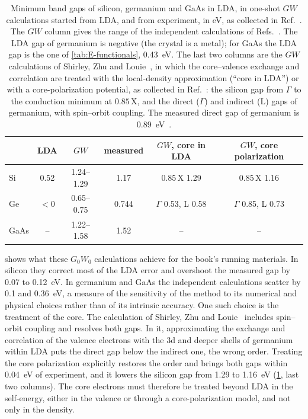 \begin{table}[t]
  \centering
  \caption{Minimum band gaps of silicon, germanium and GaAs in LDA, in one-shot $GW$ calculations started from LDA, and from experiment, in eV, as collected in Ref.~\cite[Table~I]{aryasetiawan1998gw}. The $GW$ column gives the range of the independent calculations of Refs.~\cite{hybertsen1986electron,godby1988self,rohlfing1993quasiparticle,zhu1991quasiparticle}. The LDA gap of germanium is negative (the crystal is a metal); for GaAs the LDA gap is the one of \cref{tab:E-functionals}, \SI{0.43}{eV}. The last two columns are the $GW$ calculations of Shirley, Zhu and Louie~\cite{shirley1992core}, in which the core--valence exchange and correlation are treated with the local-density approximation (``core in LDA'') or with a core-polarization potential, as collected in Ref.~\cite[Table~II]{aryasetiawan1998gw}: the silicon gap from $\Gamma$ to the conduction minimum at $0.85\,$X, and the direct ($\Gamma$) and indirect (L) gaps of germanium, with spin--orbit coupling. The measured direct gap of germanium is \SI{0.89}{eV}~\cite[Table~II]{aryasetiawan1998gw}.}
  \label{tab:E-gw}
  \begin{tabular}{l ccc cc}
    \toprule
    & LDA & $GW$ & measured & $GW$, core in LDA & $GW$, core polarization \\
    \midrule
    Si & 0.52 & 1.24--1.29 & 1.17 & $0.85\,$X 1.29 & $0.85\,$X 1.16 \\
    Ge & $<0$ & 0.65--0.75 & 0.744 & $\Gamma$ 0.53, L 0.58 & $\Gamma$ 0.85, L 0.73 \\
    GaAs & -- & 1.22--1.58 & 1.52 & -- & -- \\
    \bottomrule
  \end{tabular}
\end{table}

 shows what these $G_0W_0$ calculations achieve for the book's running materials. In silicon they correct most of the LDA error and overshoot the measured gap by 0.07 to \SI{0.12}{eV}. In germanium and GaAs the independent calculations scatter by 0.1 and \SI{0.36}{eV}, a measure of the sensitivity of the method to its numerical and physical choices rather than of its intrinsic accuracy. One such choice is the treatment of the core. The calculation of Shirley, Zhu and Louie~\cite{shirley1992core} includes spin--orbit coupling and resolves both gaps. In it, approximating the exchange and correlation of the valence electrons with the 3d and deeper shells of germanium within LDA puts the direct gap below the indirect one, the wrong order. Treating the core polarization explicitly restores the order and brings both gaps within \SI{0.04}{eV} of experiment, and it lowers the silicon gap from 1.29 to \SI{1.16}{eV} (\cref{tab:E-gw}, last two columns). The core electrons must therefore be treated beyond LDA in the self-energy, either in the valence or through a core-polarization model, and not only in the density.

